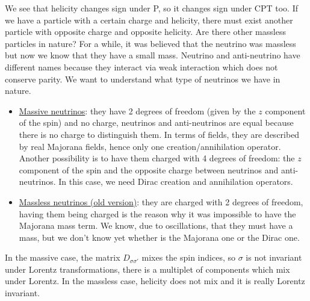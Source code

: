 \documentclass[../main.tex]{subfiles}
\begin{document}
\noindent
We see that helicity changes sign under P, so it changes sign under CPT too. If we have a particle with a certain charge and helicity, there must exist another particle with opposite charge and opposite helicity. Are there other massless particles in nature? For a while, it was believed that the neutrino was massless but now we know that they have a small mass. Neutrino and anti-neutrino have different names because they interact via weak interaction which does not conserve parity. We want to understand what type of neutrinos we have in nature.
\begin{itemize}
    \item \underline{Massive neutrinos}: they have 2 degrees of freedom (given by the $z$ component of the spin) and no charge, neutrinos and anti-neutrinos are equal because there is no charge to distinguish them. In terms of fields, they are described by real Majorana fields, hence only one creation/annihilation operator. Another possibility is to have them charged with 4 degrees of freedom: the $z$ component of the spin and the opposite charge between neutrinos and anti-neutrinos. In this case, we need Dirac creation and annihilation operators.
    \item \underline{Massless neutrinos (old version)}: they are charged with 2 degrees of freedom, having them being charged is the reason why it was impossible to have the Majorana mass term. We know, due to oscillations, that they must have a mass, but we don't know yet whether is the Majorana one or the Dirac one.
\end{itemize}
In the massive case, the matrix $D_{\sigma\sigma'}$ mixes the spin indices, so $\sigma$ is not invariant under Lorentz transformations, there is a multiplet of components which mix under Lorentz. In the massless case, helicity does not mix and it is really Lorentz invariant.
\end{document}
